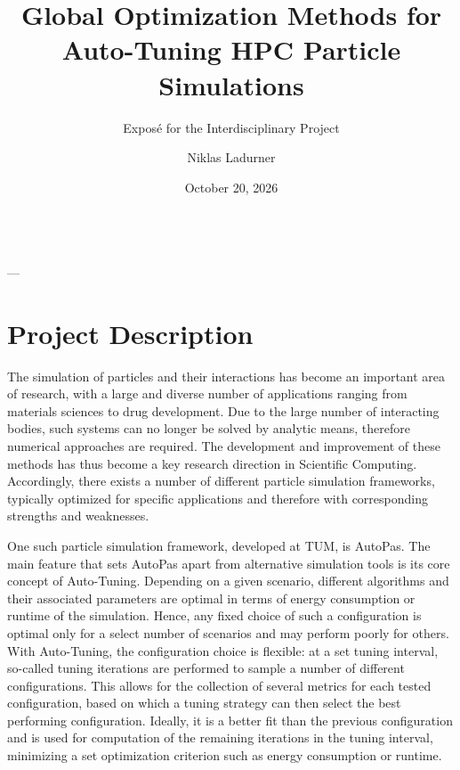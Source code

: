 \documentclass[11pt,parskip=full+]{scrartcl}
\title{Global Optimization Methods for Auto-Tuning HPC Particle Simulations}
\subtitle{Exposé for the Interdisciplinary Project}
\author{Niklas Ladurner}
\date{October 20, 2026}
\makeatletter
\renewcommand{\maketitle}{
	\begin{center}
		{\LARGE\bfseries \@title}\\[2pt]
		\large \@author{} --- \@subtitle
	\end{center}
	\let\thedate\@date
	\let\theauthor\@author
	\let\thetitle\@title
}
\makeatother
\begin{document}
\maketitle
{}
\onehalfspacing


\section*{Project Description}
\vspace*{-1em}
The simulation of particles and their interactions has become an important area of research, with a large and diverse number of applications ranging from materials sciences to drug development. Due to the large number of interacting bodies, such systems can no longer be solved by analytic means, therefore numerical approaches are required. The development and improvement of these methods has thus become a key research direction in Scientific Computing. Accordingly, there exists a number of different particle simulation frameworks, typically optimized for specific applications and therefore with corresponding strengths and weaknesses.

One such particle simulation framework, developed at TUM, is AutoPas. The main feature that sets AutoPas apart from alternative simulation tools is its core concept of Auto-Tuning. Depending on a given scenario, different algorithms and their associated parameters are optimal in terms of energy consumption or runtime of the simulation. Hence, any fixed choice of such a configuration is optimal only for a select number of scenarios and may perform poorly for others. With Auto-Tuning, the configuration choice is flexible: at a set tuning interval, so-called tuning iterations are performed to sample a number of different configurations. This allows for the collection of several metrics for each tested configuration, based on which a tuning strategy can then select the best performing configuration. Ideally, it is a better fit than the previous configuration and is used for computation of the remaining iterations in the tuning interval, minimizing a set optimization criterion such as energy consumption or runtime. \cite{Newcome2025,Gratl2019,Seckler2021,Gratl2021}
\end{document}
